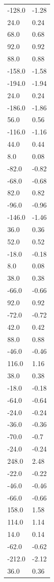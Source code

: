 \begin{longtable}{ll}
-128.0 & -1.28 \\
24.0 & 0.24 \\
68.0 & 0.68 \\
92.0 & 0.92 \\
88.0 & 0.88 \\
-158.0 & -1.58 \\
-194.0 & -1.94 \\
24.0 & 0.24 \\
-186.0 & -1.86 \\
56.0 & 0.56 \\
-116.0 & -1.16 \\
44.0 & 0.44 \\
8.0 & 0.08 \\
-82.0 & -0.82 \\
-68.0 & -0.68 \\
82.0 & 0.82 \\
-96.0 & -0.96 \\
-146.0 & -1.46 \\
36.0 & 0.36 \\
52.0 & 0.52 \\
-18.0 & -0.18 \\
8.0 & 0.08 \\
38.0 & 0.38 \\
-66.0 & -0.66 \\
92.0 & 0.92 \\
-72.0 & -0.72 \\
42.0 & 0.42 \\
88.0 & 0.88 \\
-46.0 & -0.46 \\
116.0 & 1.16 \\
38.0 & 0.38 \\
-18.0 & -0.18 \\
-64.0 & -0.64 \\
-24.0 & -0.24 \\
-36.0 & -0.36 \\
-70.0 & -0.7 \\
-24.0 & -0.24 \\
248.0 & 2.48 \\
-22.0 & -0.22 \\
-46.0 & -0.46 \\
-66.0 & -0.66 \\
158.0 & 1.58 \\
114.0 & 1.14 \\
14.0 & 0.14 \\
-62.0 & -0.62 \\
-212.0 & -2.12 \\
36.0 & 0.36 \\

\end{longtable}
